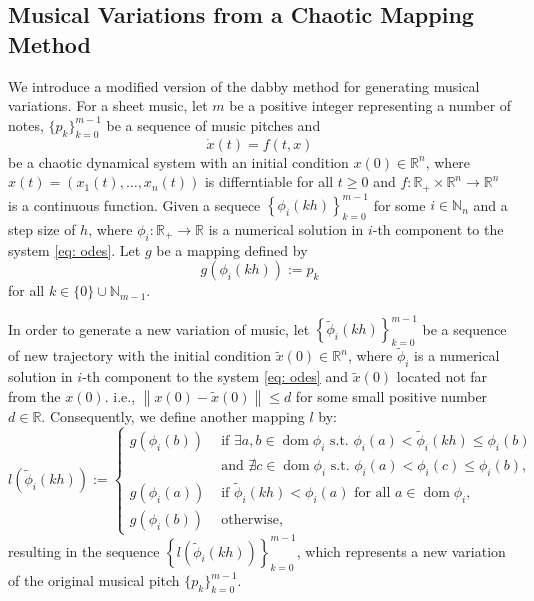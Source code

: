 \documentclass[11pt]{article}
\theoremstyle{definition}
\DeclareMathOperator{\dom}{dom}
\begin{document}
\subsection{Musical Variations from a Chaotic Mapping Method}
\label{ss: mvfacm}
We introduce a modified version of the dabby method \cite{dabby_musical_1996} for generating musical variations.
For a sheet music, let $m$ be a positive integer representing a number of notes, $\{p_k\}_{k=0}^{m-1}$ be a sequence of music pitches and   
\begin{equation} \label{eq: odes}
\dot{x}(t) = f(t,x)
\end{equation}
be a chaotic dynamical system with an initial condition $x(0) \in \mathbb{R}^n$, where $x(t) = \left(x_1(t), \ldots, x_n(t)\right)$ is differntiable for all $t \geq 0$ and $f: \mathbb{R}_{+} \times \mathbb{R}^n \to \mathbb{R}^n$ is a continuous function. 
Given a sequece
$ \displaystyle\left\{\phi_i(kh) \right\}_{k=0}^{m-1}$ 
for some $i \in \mathbb{N}_n$ and a step size of $h$, where $\phi_i:\mathbb{R}_+ \to \mathbb{R}$ is a numerical solution in $i$-th component to the system \eqref{eq: odes}. Let $g$ be a mapping defined by 
\begin{equation} \label{eq: gmap}
g(\phi_i(kh)) := p_k
\end{equation}
for all $k \in \{0\}\cup\mathbb{N}_{m-1}$.

In order to generate a new variation of music, let $ \left\{\tilde{\phi}_i(kh) \right\}_{k=0}^{m-1} $ be a sequence of new trajectory with the initial condition $\tilde{x}(0) \in \mathbb{R}^n$, where $\tilde{\phi}_i$ is a numerical solution in $i$-th component to the system \eqref{eq: odes} and $\tilde{x}(0)$ located not far from the $x(0)$. i.e., $ \left\lVert x(0) - \tilde{x}(0) \right\rVert \leq d$ for some small positive number $d \in \mathbb{R}$. Consequently, we define another mapping $l$ by: 
\begin{equation} \label{eq: lmap}
l\left(\tilde{\phi}_i(kh)\right) := 
\begin{cases}
  g(\phi_i(b)) & \text{ if }\exists a, b \in \dom{\phi_i} \text{ s.t. } \phi_i(a) < \tilde{\phi}_i(kh) \leq \phi_i(b) \\
  & \text{ and } \nexists c \in \dom{\phi_i} \text{ s.t. } \phi_i(a) < \phi_i(c) \leq \phi_i(b), \\
  g(\phi_i(a)) & \text{ if } \tilde{\phi}_i(kh) < \phi_i(a) \text{ for all } a \in \dom{\phi_i}, \\
  g(\phi_i(b)) & \text{ otherwise},
\end{cases}
\end{equation}
resulting in the sequence $\left\{ l\left(\tilde{\phi}_i(kh)\right) \right\}_{k = 0}^{m - 1}$, which represents a new variation of the original musical pitch $\{p_k\}_{k=0}^{m-1}$. 
\end{document}
